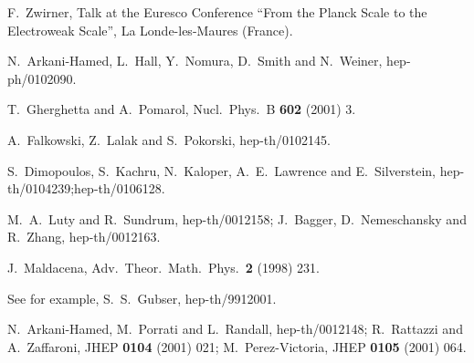 \documentclass[a4paper,12pt]{article}
\begin{document}
\begin{thebibliography}{99}
F.~Zwirner, Talk at the
Euresco Conference ``From the Planck Scale to the Electroweak Scale'',
La Londe-les-Maures (France).


N.~Arkani-Hamed, L.~Hall, Y.~Nomura, D.~Smith and N.~Weiner,
hep-ph/0102090.







T.~Gherghetta and A.~Pomarol,
Nucl.\ Phys.\ B {\bf 602} (2001) 3.


A.~Falkowski, Z.~Lalak and S.~Pokorski,
hep-th/0102145.



S.~Dimopoulos, S.~Kachru, N.~Kaloper, A.~E.~Lawrence and E.~Silverstein,
hep-th/0104239;hep-th/0106128.







M.~A.~Luty and R.~Sundrum,
hep-th/0012158;
J.~Bagger, D.~Nemeschansky and R.~Zhang,
hep-th/0012163.




J.~Maldacena,
Adv.\ Theor.\ Math.\ Phys.\ {\bf 2} (1998) 231.


See for example, S.~S.~Gubser,
hep-th/9912001.


N.~Arkani-Hamed, M.~Porrati and L.~Randall,
hep-th/0012148;
R.~Rattazzi and A.~Zaffaroni,
JHEP {\bf 0104} (2001) 021;
M.~Perez-Victoria,
JHEP {\bf 0105} (2001) 064.






\end{thebibliography}
\end{document}
